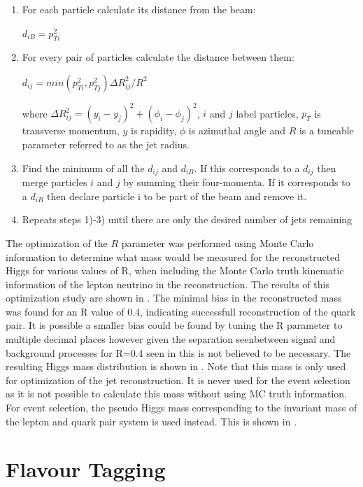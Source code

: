 \begin{enumerate}
\item For each particle calculate its distance from the beam:
\begin{center}
  $d_{iB} = p_{Ti}^2$
\end{center}
\item For every pair of particles calculate the distance between them:
\begin{center}
  $d_{ij}=min(p_{Ti}^2,p_{Tj}^2)\Delta R_{ij}^2/R^2$
\end{center}
where $\Delta R_{ij}^2=(y_i-y_j)^2 + (\phi_i-\phi_j)^2$, $i$ and $j$ label particles, $p_T$ is transverse momentum, $y$ is rapidity, $\phi$ is azimuthal angle and $R$ is a tuneable parameter referred to as the jet radius.
\item Find the minimum of all the $d_{ij}$ and $d_{iB}$. If this corresponds to a $d_{ij}$ then merge particles $i$ and $j$ by summing their four-momenta. If it corresponds to a $d_{iB}$ then declare particle i to be part of the beam and remove it.
\item Repeats steps 1)-3) until there are only the desired number of jets remaining
\end{enumerate}

The optimization of the $R$ parameter was performed using Monte Carlo information to determine what mass would be measured for the reconstructed Higgs for various values of R, when including the Monte Carlo truth kinematic information of the lepton neutrino in the reconstruction. The results of this optimization study are shown in . The minimal bias in the reconstructed mass was found for an R value of 0.4, indicating successfull reconstruction of the quark pair. It is possible a smaller bias could be found by tuning the R parameter to multiple decimal places however given the separation seenbetween signal and background processes for R=0.4 seen in  this is not believed to be necessary. The resulting Higgs mass distribution is shown in . Note that this mass is only used for optimization of the jet reconstruction. It is never used for the event selection as it is not possible to calculate this mass without using MC truth information. For event selection, the pseudo Higgs mass corresponding to the invariant mass of the lepton and quark pair system is used instead. This is shown in .



\section{Flavour Tagging}

